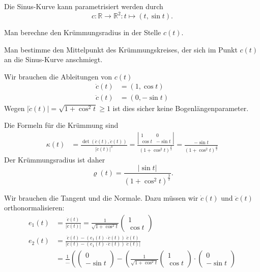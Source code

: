 Die Sinus-Kurve kann parametrisiert werden durch
\[
c\colon \mathbb R\to \mathbb R^2 : t\mapsto (t,\sin t).
\]
\begin{teilaufgaben}
\item
Man berechne den Krümmungsradius in der Stelle $c(t)$.
\item
Man bestimme den Mittelpunkt des Krümmungskreises, der sich im Punkt $c(t)$
an die Sinus-Kurve anschmiegt.
\end{teilaufgaben}


\begin{loesung}
Wir brauchen die Ableitungen von $c(t)$
\begin{align*}
\dot c(t)
&=
(1,\cos t)
\\
\ddot c(t)
&=
(0,-\sin t)
\end{align*}
Wegen $|\dot c(t)|=\sqrt{1+\cos^2t}\ge 1$ ist dies sicher keine Bogenlängenparameter.
\begin{teilaufgaben}
\item
Die Formeln für die Krümmung sind
\begin{align*}
\kappa(t)
&=
\frac{\det(\dot c(t),\ddot c(t))}{|\dot c(t)|^3}
=
\frac{\left|\begin{matrix}1&0\\\cos t&-\sin t\end{matrix}\right|}{(1+\cos^2t)^\frac32}
=
\frac{-\sin t}{(1+\cos^2t)^\frac32}
\end{align*}
Der Krümmungsradius ist daher
\[
\varrho(t)
=
\frac{|\sin t|}{(1+\cos^2t)^\frac32}.
\]
\item
Wir brauchen die Tangent und die Normale.
Dazu müssen wir $\dot c(t)$ und $\ddot c(t)$ orthonormalisieren:
\begin{align*}
e_1(t)
&=
\frac{\dot c(t)}{|\dot c(t)|}
=
\frac1{\sqrt{1+\cos^2t}}
\begin{pmatrix}1\\ \cos t\end{pmatrix}
\\
e_2(t)
&=
\frac{\ddot c(t) - (e_1(t)\cdot \ddot c(t))\;\ddot c(t)}{|\ddot c(t) - (e_1(t)\cdot \ddot c(t))\;\ddot c(t)|}
\\
&=
\frac{1}{\dots}\left(
\begin{pmatrix}0\\-\sin t\end{pmatrix}
-
\left(
\frac{1}{\sqrt{1+\cos^2t}}
\begin{pmatrix}1\\\cos t\end{pmatrix}
\cdot
\begin{pmatrix}0\\-\sin t\end{pmatrix}

\end{align*}
\end{teilaufgaben}
\end{loesung}
